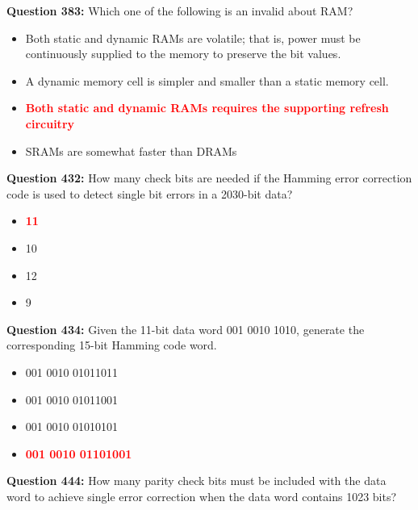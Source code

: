\documentclass[12pt,a4paper]{article}
\begin{document}
\vspace{0.5cm}

\textbf{Question 383:} Which one of the following is an invalid about RAM?

\begin{itemize}
    \item[\textbf{A.}] Both static and dynamic RAMs are volatile; that is, power must be continuously supplied to the memory to preserve the bit values.
    \item[\textbf{B.}] A dynamic memory cell is simpler and smaller than a static memory cell.
    \item[\textbf{C.}] \textcolor{red}{\textbf{Both static and dynamic RAMs requires the supporting refresh circuitry}}
    \item[\textbf{D.}] SRAMs are somewhat faster than DRAMs
\end{itemize}

\vspace{0.5cm}

\textbf{Question 432:} How many check bits are needed if the Hamming error correction code is used to detect single bit errors in a 2030-bit data?

\begin{itemize}
    \item[\textbf{A.}] \textcolor{red}{\textbf{11}}
    \item[\textbf{B.}] 10
    \item[\textbf{C.}] 12
    \item[\textbf{D.}] 9
\end{itemize}

\vspace{0.5cm}

\textbf{Question 434:} Given the 11-bit data word 001 0010 1010, generate the corresponding 15-bit Hamming code word.

\begin{itemize}
    \item[\textbf{A.}] 001 0010 01011011
    \item[\textbf{B.}] 001 0010 01011001
    \item[\textbf{C.}] 001 0010 01010101
    \item[\textbf{D.}] \textcolor{red}{\textbf{001 0010 01101001}}
\end{itemize}

\vspace{0.5cm}

\textbf{Question 444:} How many parity check bits must be included with the data word to achieve single error correction when the data word contains 1023 bits?
\end{document}
